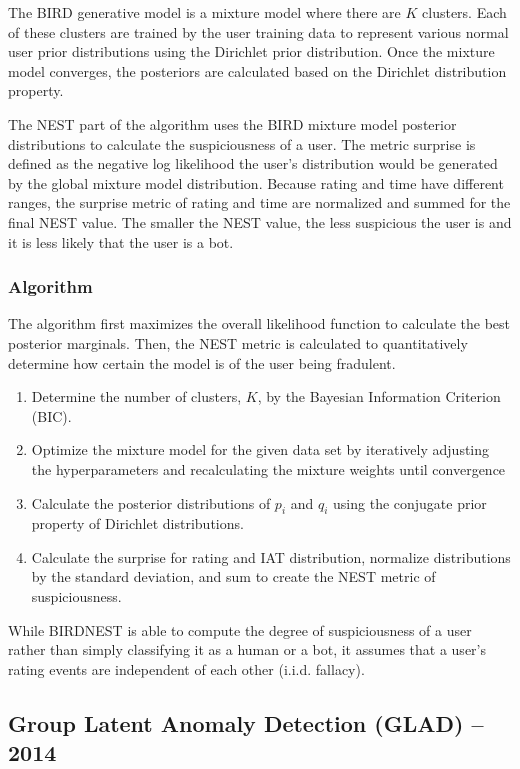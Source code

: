 \documentclass[11pt, oneside]{article}   	%
\begin{document}
\quad The BIRD generative model is a mixture model where there are $K$ clusters.
Each of these clusters are trained by the user training data to represent various normal user prior distributions using the Dirichlet prior distribution.
Once the mixture model converges, the posteriors are calculated based on the Dirichlet distribution property.

\quad The NEST part of the algorithm uses the BIRD mixture model posterior distributions to calculate the suspiciousness of a user.
The metric surprise is defined as the negative log likelihood the user's distribution would be generated by the global mixture model distribution.
Because rating and time have different ranges, the surprise metric of rating and time are normalized and summed for the final NEST value.
The smaller the NEST value, the less suspicious the user is and it is less likely that the user is a bot.

\subsubsection*{Algorithm}

\quad The algorithm first maximizes the overall likelihood function to calculate the best posterior marginals.
Then, the NEST metric is calculated to quantitatively determine how certain the model is of the user being fradulent.
\begin{enumerate}
	\item Determine the number of clusters, $K$, by the Bayesian Information Criterion (BIC).
	\item Optimize the mixture model for the given data set by iteratively adjusting the hyperparameters and recalculating the mixture weights until convergence
	\item Calculate the posterior distributions of $p_i$ and $q_i$ using the conjugate prior property of Dirichlet distributions.
	\item Calculate the surprise for rating and IAT distribution, normalize distributions by the standard deviation, and sum to create the NEST metric of suspiciousness. 
\end{enumerate}

\quad While BIRDNEST is able to compute the degree of suspiciousness of a user rather than simply classifying it as a human or a bot, it assumes that a user's rating events are independent of each other (i.i.d. fallacy).

\subsection*{Group Latent Anomaly Detection (GLAD) -- 2014}
\end{document}
